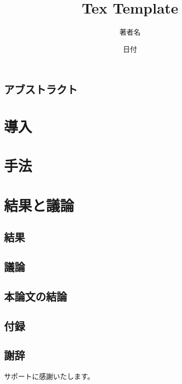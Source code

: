 \documentclass[a4paper,12pt,twoside,openany]{jsbook}
\begin{document}
\frontmatter

\title{Tex Template}
\author{著者名}
\date{日付}
\newpage
\maketitle

\newpage
\chapter*{アブストラクト}


\newpage
\tableofcontents
\thispagestyle{empty}
\newpage
\mainmatter

\part{導入}
\label{part1}


\part{手法}
\label{part2}


\part{結果と議論}
\label{part3}
\setcounter{chapter}{0}

\chapter{結果}


\chapter{議論}


\chapter*{本論文の結論}
\label{conc}


\appendix
{}
\chapter*{付録}
\renewcommand{\thesection}{A.\arabic{section}}
\renewcommand{\thefigure}{A.\arabic{figure}}
\label{app}


\backmatter
{}
\chapter*{謝辞}
サポートに感謝いたします。


\end{document}
